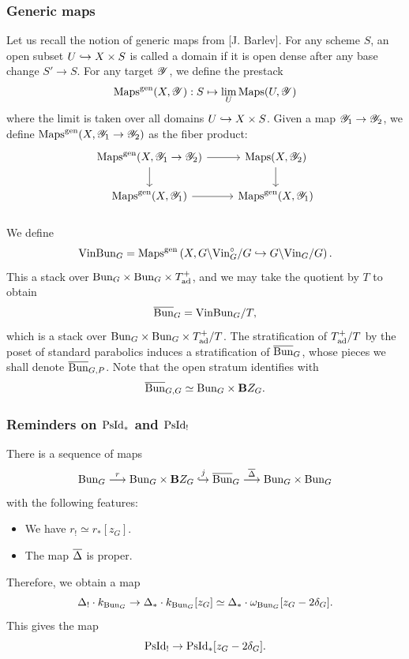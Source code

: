 \subsubsection{Generic maps} Let us recall the notion of generic maps from [J. Barlev]. For any scheme $S$, an open subset $U \hookrightarrow X \times S$ is called a domain if it is open dense after any base change $S' \to S$. For any target $\mathscr{Y}$, we define the prestack
    \[
    \mathrm{Maps}^{\mathrm{gen}}(X, \mathscr{Y}) : S \mapsto
    \lim_U \mathrm{Maps}(U, \mathscr{Y})
    \]
where the limit is taken over all domains $U \hookrightarrow X \times S$. Given a map $\mathscr{Y}_1 \to \mathscr{Y}_2$, we define $\mathrm{Maps}^{\mathrm{gen}}(X, \mathscr{Y}_1 \to \mathscr{Y}_2)$ as the fiber product:
\[
\begin{tikzcd}
    \Maps^\gen(X, \YY_1 \to \YY_2) \arrow[r] \arrow[d] &  \Maps(X, \YY_2) \arrow[d] \\
    \Maps^\gen(X, \YY_1) \arrow[r] & \Maps^\gen(X, \YY_1)
\end{tikzcd}
\]

\subsubsection{} We define
    \[
    \mathrm{Vin}\mathrm{Bun}_G = \mathrm{Maps}^{\mathrm{gen}} \left(X, G \backslash \mathrm{Vin}^\circ_G / G \hookrightarrow G \backslash \mathrm{Vin}_G / G \right).
    \]
This a stack over $\mathrm{Bun}_G \times \mathrm{Bun}_G \times T_{\mathrm{ad}}^+$, and we may take the quotient by $T$ to obtain
    \[\overline{\mathrm{Bun}}_G = \mathrm{VinBun}_G / T,\]
which is a stack over $\mathrm{Bun}_G \times \mathrm{Bun}_G \times T_{\mathrm{ad}}^+/T$. The stratification of $T_{\mathrm{ad}}^+/T$ by the poset of standard parabolics induces a stratification of $\overline{\mathrm{Bun}}_G$, whose pieces we shall denote $\overline{\mathrm{Bun}}_{G,P}$. Note that the open stratum identifies with
    \[\overline{\mathrm{Bun}}_{G,G} \simeq \mathrm{Bun}_G \times \mathbf{B} Z_G.\]

\subsubsection{Reminders on $\mathrm{PsId}_*$ and $\mathrm{PsId}_!$} There is a sequence of maps
  \[\mathrm{Bun}_G \overset{r}{\longrightarrow} \mathrm{Bun}_G \times \mathbf{B} Z_G \overset{j}{\hookrightarrow} \overline{\mathrm{Bun}}_G \overset{\overline{\Delta}}{\longrightarrow} \mathrm{Bun}_G \times \mathrm{Bun}_G\]
with the following features:
\begin{itemize}
    \item We have $r_! \simeq r_* [z_G]$.
    \item The map $\overline{\Delta}$ is proper.
\end{itemize}
Therefore, we obtain a map
    \[\Delta_! \cdot k_{\mathrm{Bun}_G} \to \Delta_* \cdot k_{\mathrm{Bun}_G} [z_G] \simeq \Delta_* \cdot \omega_{\mathrm{Bun}_G} [z_G - 2 \delta_G].\]
This gives the map
    \[\mathrm{PsId}_! \to \mathrm{PsId}_* [z_G - 2 \delta_G].\]

